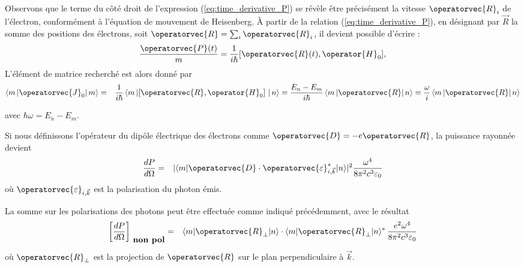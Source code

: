 Observons que le terme du côté droit de l'expression (\ref{eq:time_derivative_P}) se révèle être précisément la vitesse $\operatorvec{R}_i$ de l'électron, conformément à l'équation de mouvement de Heisenberg. À partir de la relation (\ref{eq:time_derivative_P}), en désignant par $\vec{R}$ la somme des positions des électrons, soit $\operatorvec{R} = \sum_i \operatorvec{R}_i$, il devient possible d'écrire :
\begin{equation}
\frac{\operatorvec{P}(t)}{m} = \frac{1}{i \hbar} [\operatorvec{R}(t) , \operator{H}_0 ], 
\end{equation}
L'élément de matrice recherché est alors donné par
\begin{eqnarray}
	\left \langle m \left \vert  \operatorvec{J}_0 \right \vert m \right \rangle & = & \frac{1}{ i \hbar } \left \langle m \left \vert  \left [ \operatorvec{R} , \operator{H}_0 \right ]  \right \vert n \right \rangle	= \frac{ E_n - E_m }{i \hbar } \left \langle m \left \vert  \operatorvec{R}  \right \vert n \right \rangle = \frac{\omega}{i} \left \langle m \left \vert  \operatorvec{R}  \right \vert n\right \rangle
\end{eqnarray}

avec $\hbar \omega = E_n - E_m $.

Si nous définissons l'opérateur du dipôle électrique des électrons comme $\operatorvec{D} = -e\operatorvec{R}$, la puissance rayonnée devient
\begin{eqnarray}
\frac{dP}{d\Omega} & = &\vert \langle m | \operatorvec{D} \cdot \operatorvec{\varepsilon}_{i,\vec{k}}^\ast  | n \rangle \vert^2 \frac{\omega^4}{8\pi^2c^3 \varepsilon_0}\label{eq:puissance}
\end{eqnarray}
où $\operatorvec{\varepsilon}_{i,\vec{k}}$ est la polarisation du photon émis.

La somme sur les polarisations des photons peut être effectuée comme indiqué précédemment, avec le résultat
\begin{eqnarray}
\left [ \frac{dP}{d\Omega} \right ]_{\mbox{ \bf non pol}} & =&  \langle m | \operatorvec{R}_\perp | n \rangle \cdot \langle m | \operatorvec{R}_\perp | n \rangle^\ast \, \frac{e^2 \omega^4}{8 \pi^2 c^3 \varepsilon_0}
\end{eqnarray}
où $\operatorvec{R}_\perp$ est la projection de $\operatorvec{R}$ sur le plan perpendiculaire à $\vec{k}$.

